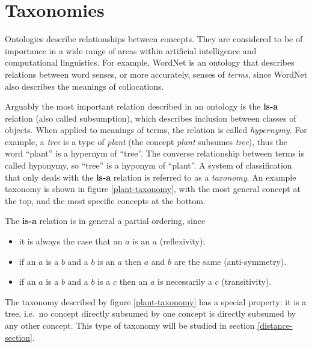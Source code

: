 \section{Taxonomies}
\label{taxonomy}

Ontologies describe relationships between concepts. They are considered to be of importance in a wide range of areas within artificial intelligence and computational linguistics. For example, WordNet \citep{Fellbaum:98} is an ontology that describes relations between word senses, or more accurately, senses of \emph{terms}, since WordNet also describes the meanings of collocations.

Arguably the most important relation described in an ontology is the \textbf{is-a} relation (also called subsumption), which describes inclusion between classes of objects.  When applied to meanings of terms, the relation is called \emph{hypernymy}. For example, a \emph{tree} is a type of \emph{plant} (the concept \emph{plant} subsumes \emph{tree}), thus the word ``plant'' is a hypernym of ``tree''. The converse relationship between terms is called hyponymy, so ``tree'' is a hyponym of ``plant''. A system of classification that only deals with the \textbf{is-a} relation is referred to as a \emph{taxonomy}. An example taxonomy is shown in figure \ref{plant-taxonomy}, with the most general concept at the top, and the most specific concepts at the bottom.

The \textbf{is-a} relation is in general a partial ordering, since
\begin{itemize}
\item it is always the case that an $a$ is an $a$ (reflexivity);
\item if an $a$ is a $b$ and a $b$ is an $a$ then $a$ and $b$ are the same (anti-symmetry).
\item if an $a$ is a $b$ and a $b$ is a $c$ then an $a$ is necessarily a $c$ (transitivity).
\end{itemize}

The taxonomy described by figure \ref{plant-taxonomy} has a special property: it is a tree, i.e.~no concept directly subsumed by one concept is directly subsumed by any other concept. This type of taxonomy will be studied in section \ref{distance-section}.

